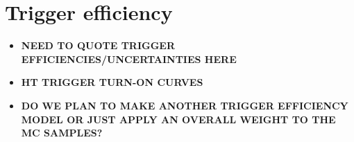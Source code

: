 \section{Trigger efficiency}
\label{sec:trgEff}

\begin{itemize}
\item {\color{red} \bf NEED TO QUOTE TRIGGER EFFICIENCIES/UNCERTAINTIES HERE }
\item {\color{red} \bf HT TRIGGER TURN-ON CURVES }
\item {\color{red} \bf DO WE PLAN TO MAKE ANOTHER TRIGGER EFFICIENCY MODEL OR JUST APPLY AN OVERALL WEIGHT TO THE MC SAMPLES?}
\end{itemize}


